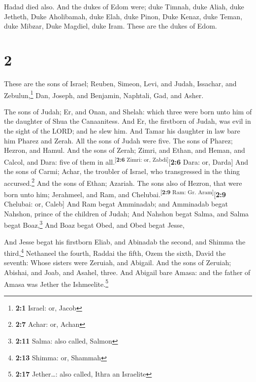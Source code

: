  Hadad died also. And the dukes of Edom were; duke
Timnah, duke Aliah, duke Jetheth,  Duke Aholibamah, duke
Elah, duke Pinon,  Duke Kenaz, duke Teman, duke Mibzar,
 Duke Magdiel, duke Iram. These are the dukes of Edom.

\hypertarget{section-1}{%
\section{2}\label{section-1}}

 These are the sons of Israel; Reuben, Simeon, Levi, and
Judah, Issachar, and Zebulun,\footnote{\textbf{2:1} Israel: or, Jacob}
 Dan, Joseph, and Benjamin, Naphtali, Gad, and Asher.

 The sons of Judah; Er, and Onan, and Shelah: which three
were born unto him of the daughter of Shua the Canaanitess. And Er, the
firstborn of Judah, was evil in the sight of the LORD; and he slew him.
 And Tamar his daughter in law bare him Pharez and Zerah.
All the sons of Judah were five.  The sons of Pharez;
Hezron, and Hamul.  And the sons of Zerah; Zimri, and
Ethan, and Heman, and Calcol, and Dara: five of them in
all.\textsuperscript{{[}\textbf{2:6} Zimri: or, Zabdi{]}}{[}\textbf{2:6}
Dara: or, Darda{]}  And the sons of Carmi; Achar, the
troubler of Israel, who transgressed in the thing accursed.\footnote{\textbf{2:7}
  Achar: or, Achan}  And the sons of Ethan; Azariah.
 The sons also of Hezron, that were born unto him;
Jerahmeel, and Ram, and Chelubai.\textsuperscript{{[}\textbf{2:9} Ram:
Gr. Aram{]}}{[}\textbf{2:9} Chelubai: or, Caleb{]}  And
Ram begat Amminadab; and Amminadab begat Nahshon, prince of the children
of Judah;  And Nahshon begat Salma, and Salma begat
Boaz,\footnote{\textbf{2:11} Salma: also called, Salmon} 
And Boaz begat Obed, and Obed begat Jesse,

 And Jesse begat his firstborn Eliab, and Abinadab the
second, and Shimma the third,\footnote{\textbf{2:13} Shimma: or, Shammah}
 Nethaneel the fourth, Raddai the fifth, 
Ozem the sixth, David the seventh:  Whose sisters were
Zeruiah, and Abigail. And the sons of Zeruiah; Abishai, and Joab, and
Asahel, three.  And Abigail bare Amasa: and the father of
Amasa was Jether the Ishmeelite.\footnote{\textbf{2:17} Jether\ldots:
  also called, Ithra an Israelite}

